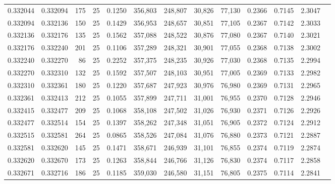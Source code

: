 \begin{tabular}{rrrrrrrrrrrrr}
0.332044 & 0.332094 &   175 &  25 &                                     0.1250 & 356,803 & 248,807 &  30,826 &  77,130 & 0.2366 & 0.7145 & 2.3047 \\
0.332094 & 0.332136 &   150 &  25 &                                     0.1429 & 356,953 & 248,657 &  30,851 &  77,105 & 0.2367 & 0.7142 & 2.3033 \\
0.332136 & 0.332176 &   135 &  25 &                                     0.1562 & 357,088 & 248,522 &  30,876 &  77,080 & 0.2367 & 0.7140 & 2.3021 \\
0.332176 & 0.332240 &   201 &  25 &                                     0.1106 & 357,289 & 248,321 &  30,901 &  77,055 & 0.2368 & 0.7138 & 2.3002 \\
0.332240 & 0.332270 &    86 &  25 &                                     0.2252 & 357,375 & 248,235 &  30,926 &  77,030 & 0.2368 & 0.7135 & 2.2994 \\
0.332270 & 0.332310 &   132 &  25 &                                     0.1592 & 357,507 & 248,103 &  30,951 &  77,005 & 0.2369 & 0.7133 & 2.2982 \\
0.332310 & 0.332361 &   180 &  25 &                                     0.1220 & 357,687 & 247,923 &  30,976 &  76,980 & 0.2369 & 0.7131 & 2.2965 \\
0.332361 & 0.332413 &   212 &  25 &                                     0.1055 & 357,899 & 247,711 &  31,001 &  76,955 & 0.2370 & 0.7128 & 2.2946 \\
0.332415 & 0.332477 &   209 &  25 &                                     0.1068 & 358,108 & 247,502 &  31,026 &  76,930 & 0.2371 & 0.7126 & 2.2926 \\
0.332477 & 0.332514 &   154 &  25 &                                     0.1397 & 358,262 & 247,348 &  31,051 &  76,905 & 0.2372 & 0.7124 & 2.2912 \\
0.332515 & 0.332581 &   264 &  25 &                                     0.0865 & 358,526 & 247,084 &  31,076 &  76,880 & 0.2373 & 0.7121 & 2.2887 \\
0.332581 & 0.332620 &   145 &  25 &                                     0.1471 & 358,671 & 246,939 &  31,101 &  76,855 & 0.2374 & 0.7119 & 2.2874 \\
0.332620 & 0.332670 &   173 &  25 &                                     0.1263 & 358,844 & 246,766 &  31,126 &  76,830 & 0.2374 & 0.7117 & 2.2858 \\
0.332671 & 0.332716 &   186 &  25 &                                     0.1185 & 359,030 & 246,580 &  31,151 &  76,805 & 0.2375 & 0.7114 & 2.2841 \\

\end{tabular}
